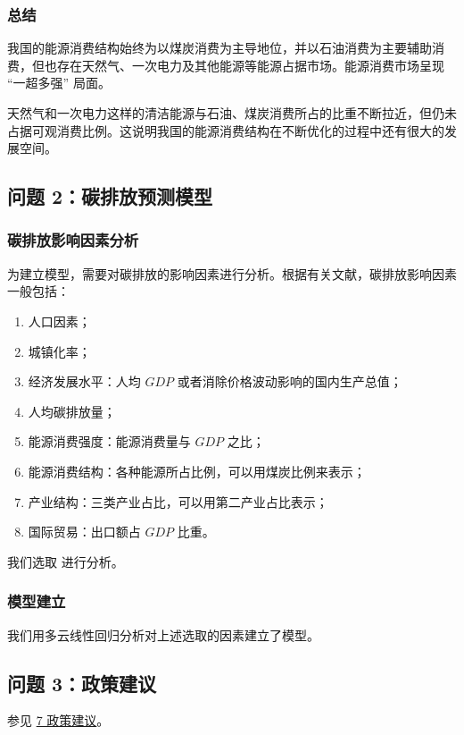     \subsubsection{总结}
    我国的能源消费结构始终为以煤炭消费为主导地位，并以石油消费为主要辅助消费，但也存在天然气、一次电力及其他能源等能源占据市场。能源消费市场呈现 “一超多强” 局面。
    
    天然气和一次电力这样的清洁能源与石油、煤炭消费所占的比重不断拉近，但仍未占据可观消费比例。这说明我国的能源消费结构在不断优化的过程中还有很大的发展空间。

  \subsection{问题 2：碳排放预测模型}

    \subsubsection{碳排放影响因素分析}
      为建立模型，需要对碳排放的影响因素进行分析。根据有关文献，碳排放影响因素一般包括：
      \begin{enumerate}
        \item 人口因素；
        \item 城镇化率；
        \item 经济发展水平：人均 $GDP$ 或者消除价格波动影响的国内生产总值；
        \item 人均碳排放量；
        \item 能源消费强度：能源消费量与 $GDP$ 之比；
        \item 能源消费结构：各种能源所占比例，可以用煤炭比例来表示；
        \item 产业结构：三类产业占比，可以用第二产业占比表示；
        \item 国际贸易：出口额占 $GDP$ 比重。
      \end{enumerate}
      我们选取%
      进行分析。
    
    \subsubsection{模型建立}
      我们用多云线性回归分析对上述选取的因素建立了模型。

  \subsection{问题 3：政策建议}
    参见 \hyperref[sec:zhencejianyi]{7 政策建议}。